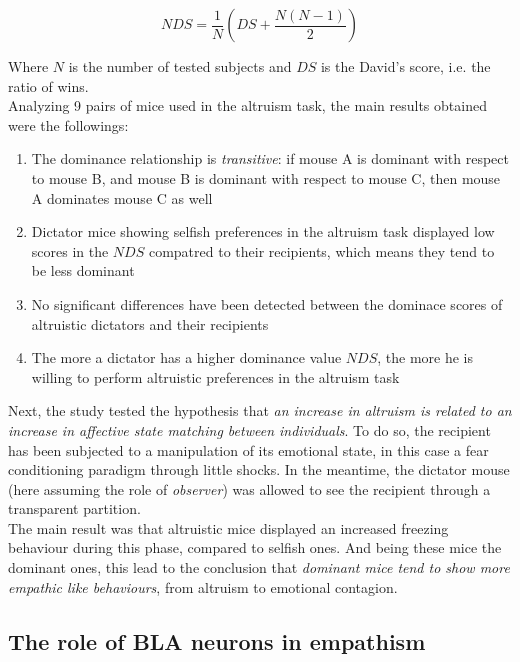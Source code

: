 \documentclass[a4paper]{article}
\begin{document}
\begin{equation}
NDS = \frac{1}{N}\left(DS + \frac{N(N-1)}{2}\right)
\end{equation}

Where $N$ is the number of tested subjects and $DS$ is the David's score, i.e. the ratio of wins.\\
Analyzing 9 pairs of mice used in the altruism task, the main results obtained were the followings:

\begin{enumerate}
	\item The dominance relationship is \textit{transitive}: if mouse A is dominant with respect to mouse B, and mouse B is dominant with respect to mouse C, then mouse A dominates mouse C as well
	
	\item Dictator mice showing selfish preferences in the altruism task displayed low scores in the $NDS$ compatred to their recipients, which means they tend to be less dominant
	
	\item No significant differences have been detected between the dominace scores of altruistic dictators and their recipients
	
	\item The more a dictator has a higher dominance value $NDS$, the more he is willing to perform altruistic preferences in the altruism task
	
\end{enumerate}

Next, the study tested the hypothesis that \textit{an increase in altruism is related to an increase in affective state matching between individuals}. To do so, the recipient has been subjected to a manipulation of its emotional state, in this case a fear conditioning paradigm through little shocks. In the meantime, the dictator mouse (here assuming the role of \textit{observer}) was allowed to see the recipient through a transparent partition.\\
The main result was that altruistic mice displayed an increased freezing behaviour during this phase, compared to selfish ones. And being these mice the dominant ones, this lead to the conclusion that \textit{dominant mice tend to show more empathic like behaviours}, from altruism to emotional contagion.

\subsection{The role of BLA neurons in empathism}
\end{document}
